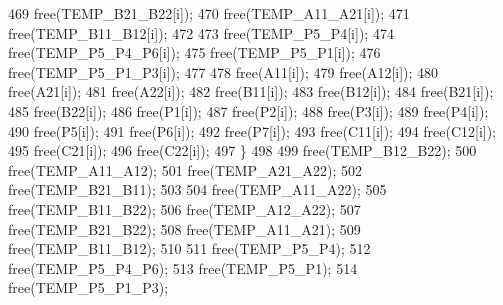 \begin{DoxyCode}
469                                                 free(TEMP\_B21\_B22[i]);
470                                                 free(TEMP\_A11\_A21[i]);
471                                                 free(TEMP\_B11\_B12[i]);
472 
473                                                 free(TEMP\_P5\_P4[i]);
474                                                 free(TEMP\_P5\_P4\_P6[i]);
475                                                 free(TEMP\_P5\_P1[i]);
476                                                 free(TEMP\_P5\_P1\_P3[i]);
477 
478                                         free(A11[i]);
479                                         free(A12[i]);
480                                         free(A21[i]);
481                                         free(A22[i]);
482                                         free(B11[i]);
483                                         free(B12[i]);
484                                         free(B21[i]);
485                                         free(B22[i]);
486                                         free(P1[i]);
487                                         free(P2[i]);
488                                         free(P3[i]);
489                                         free(P4[i]);
490                                         free(P5[i]);
491                                         free(P6[i]);
492                                         free(P7[i]);
493                                         free(C11[i]);
494                                         free(C12[i]);
495                                         free(C21[i]);
496                                         free(C22[i]);
497                                     \}
498 
499                                         free(TEMP\_B12\_B22);
500                                         free(TEMP\_A11\_A12);
501                                         free(TEMP\_A21\_A22);
502                                         free(TEMP\_B21\_B11);
503 
504                                         free(TEMP\_A11\_A22);
505                                         free(TEMP\_B11\_B22);
506                                         free(TEMP\_A12\_A22);
507                                         free(TEMP\_B21\_B22);
508                                         free(TEMP\_A11\_A21);
509                                         free(TEMP\_B11\_B12);
510 
511                                         free(TEMP\_P5\_P4);
512                                         free(TEMP\_P5\_P4\_P6);
513                                         free(TEMP\_P5\_P1);
514                                         free(TEMP\_P5\_P1\_P3);

\end{DoxyCode}
